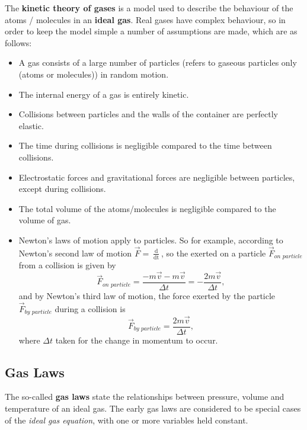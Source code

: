 The \textbf{kinetic theory of gases} is a model used to describe the behaviour of the atoms / molecules in an \textbf{ideal gas}. Real gases have complex behaviour, so in order to keep the model simple a number of assumptions are made, which are as follows:
\begin{itemize}
    \item A gas consists of a large number of particles (refers to gaseous particles only (atoms or molecules)) in random motion.
    \item The internal energy of a gas is entirely kinetic.
    \item Collisions between particles and the walls of the container are perfectly elastic.
    \item The time during collisions is negligible compared to the time between collisions.
    \item Electrostatic forces and gravitational forces are negligible between particles, except during collisions.
    \item The total volume of the atoms/molecules is negligible compared to the volume of gas.
    \item Newton's laws of motion apply to particles. So for example, according to Newton's second law of motion $\vec{F} = \frac{\mathop{\mathrm{d}\vec{p}}}{\mathop{\mathrm{d}t}}$, so the exerted on a particle $\vec{F}_{\textit{on particle}}$ from a collision is given by
    \begin{equation}
        \vec{F}_{\textit{on particle}} = \frac{-m\vec{v} - m \vec{v}}{\Delta t} = - \frac{2m\vec{v}}{\Delta t},
    \end{equation}
    and by Newton's third law of motion, the force exerted by the particle $\vec{F}_{\textit{by particle}}$ during a collision is 
    \begin{equation}
        \vec{F}_{\textit{by particle}} = \frac{2m\vec{v}}{\Delta t},
    \end{equation}
    where $\Delta t$ taken for the change in momentum to occur.
\end{itemize}


\subsection{Gas Laws}

The so-called \textbf{gas laws} state the relationships between pressure, volume and temperature of an ideal gas. The early gas laws are considered to be special cases of the \textit{ideal gas equation}, with one or more variables held constant.

